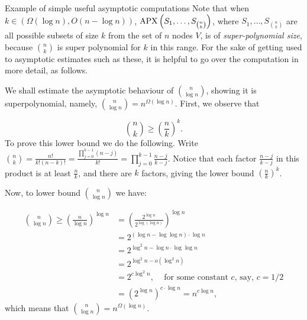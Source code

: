 \begin{trailer}{Example of simple useful asymptotic computations}
Note that when $k\in(\Omega(\log n),O(n-\log n))$, $\mathrm{APX}\left(S_1, \ldots, S_{n\choose k}\right)$, where $S_1,\dots,S_{n\choose k}$ are all possible subsets of size $k$ from the set of $n$ nodes $V$, is of \emph{super-polynomial size}, because $ n\choose k$ is super polynomial for $k$ in this range. For the sake of getting used to asymptotic estimates such as these, it is helpful to go over the computation in more detail, as follows.

We shall estimate the asymptotic behaviour of $\binom{n}{\log n} $, showing it is superpolynomial, namely, $\binom{n}{\log n} =
n^{\Omega(\log n)}$. First, we observe that

$$\binom{n}{k} \ge\left(\frac{n}{k}\right)^k. $$
To prove this lower bound we do the following.
Write $\binom{n}{k}=\frac{n!}{k!(n-k)!}=
\frac{\prod_{j=0}^{k-1}(n-j)}{k!}=\prod_{j=0}^{k-1} \frac{n-j}{k-j}$. Notice that each factor $\frac{n-j}{k-j}$ in this product is at least $\frac{n}{k}$, and there are $k$ factors, giving the lower bound $\left(\frac{n}{k}\right)^k$. 

Now, to lower bound $\binom{n}{\log n} $ we have:

\[  
\begin{aligned}
 \binom{n}{\log n} \geq\left(\frac{n}{\log n}\right)^{\log n}
& =
\left(
    \frac{2^{\log n}}
        {2^{\log (\log n)}}\right)^{\log n} \\
& =2^{(\log n-\log \log n) \cdot \log n} \\
& =2^{\log^2n-\log n \cdot \log \log n} \\
& =2^{\log ^2 n-o(\log ^2n)} \\
& = 2^{c \log ^2 n} \text {, ~~~for some constant $c$, say, $c=1/2$} \\
& =\left(2^{\log n}\right)^{c \cdot \log n}=
n^{c \log n},
\end{aligned}
\]
which means that $\binom{n}{\log n}= n^{\Omega(\log n)}$.





\end{trailer}
